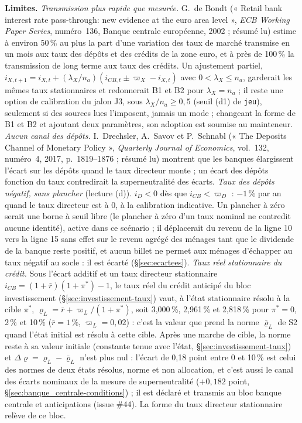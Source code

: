 \documentclass[11pt,a4paper]{article}
\newcommand{\limites}{\par\noindent\textbf{Limites.} }
\begin{document}
\begin{proposee}
\begin{lecture}
\limites \emph{Transmission plus rapide que mesurée.} G.~de Bondt (« Retail bank interest rate pass-through: new evidence at the euro area level », \emph{ECB Working Paper Series}, numéro~136, Banque centrale européenne, 2002 ; résumé lu) estime à environ 50\,\% au plus la part d'une variation des taux de marché transmise en un mois aux taux des dépôts et des crédits de la zone euro, et à près de 100\,\% la transmission de long terme aux taux des crédits. Un ajustement partiel, $i_{X,t+1} = i_{X,t} + (\lambda_X/n_a)(i_{\mathit{CB},t} \pm \varpi_X - i_{X,t})$ avec $0 < \lambda_X \le n_a$, garderait les mêmes taux stationnaires et redonnerait B1 et B2 pour $\lambda_X = n_a$ ; il reste une option de calibration du jalon J3, sous $\lambda_X/n_a \ge 0{,}5$ (seuil (d1) de \texttt{jeu}), seulement si des sources lues l'imposent, jamais un mode ; changeant la forme de B1 et B2 et ajoutant deux paramètres, son adoption est soumise au mainteneur. \emph{Aucun canal des dépôts.} I.~Drechsler, A.~Savov et P.~Schnabl (« The Deposits Channel of Monetary Policy », \emph{Quarterly Journal of Economics}, vol.~132, numéro~4, 2017, p.~1819--1876 ; résumé lu) montrent que les banques élargissent l'écart sur les dépôts quand le taux directeur monte ; un écart des dépôts fonction du taux contredirait la superneutralité des écarts. \emph{Taux des dépôts négatif, sans plancher} (lecture (d)). $i_D < 0$ dès que $i_{\mathit{CB}} < \varpi_D$ : $-1\,\%$ par an quand le taux directeur est à 0, à la calibration indicative. Un plancher à zéro serait une borne à seuil libre (le plancher à zéro d'un taux nominal ne contredit aucune identité), active dans ce scénario ; il déplacerait du revenu de la ligne 10 vers la ligne 15 sans effet sur le revenu agrégé des ménages tant que le dividende de la banque reste positif, et aucun billet ne permet aux ménages d'échapper au taux négatif au socle : il est écarté (\S\ref{sec:ecartees}). \emph{Taux réel stationnaire du crédit.} Sous l'écart additif et un taux directeur stationnaire $i_{\mathit{CB}} = (1 + \bar r)(1 + \pi^\ast) - 1$, le taux réel du crédit anticipé du bloc investissement (\S\ref{sec:investissement-taux}) vaut, à l'état stationnaire résolu à la cible $\pi^\ast$, $\varrho_L = \bar r + \varpi_L/(1 + \pi^\ast)$, soit 3,000\,\%, 2,961\,\% et 2,818\,\% pour $\pi^\ast = 0$, 2\,\% et 10\,\% ($\bar r = 1\,\%$, $\varpi_L = 0{,}02$) : c'est la valeur que prend la norme $\bar\varrho_L$ de S2 quand l'état initial est résolu à cette cible. Après une marche de cible, la norme reste à sa valeur initiale (constante tenue avec l'état, \S\ref{sec:investissement-taux}) et $\Delta\varrho = \varrho_L - \bar\varrho_L$ n'est plus nul : l'écart de 0,18 point entre 0 et 10\,\% est celui des normes de deux états résolus, norme et non allocation, et c'est aussi le canal des écarts nominaux de la mesure de superneutralité ($+0{,}182$ point, \S\ref{sec:banque_centrale-conditions}) ; il est déclaré et transmis au bloc banque centrale et anticipations (issue \#44). La forme du taux directeur stationnaire relève de ce bloc.

\end{lecture}
\end{proposee}
\end{document}
